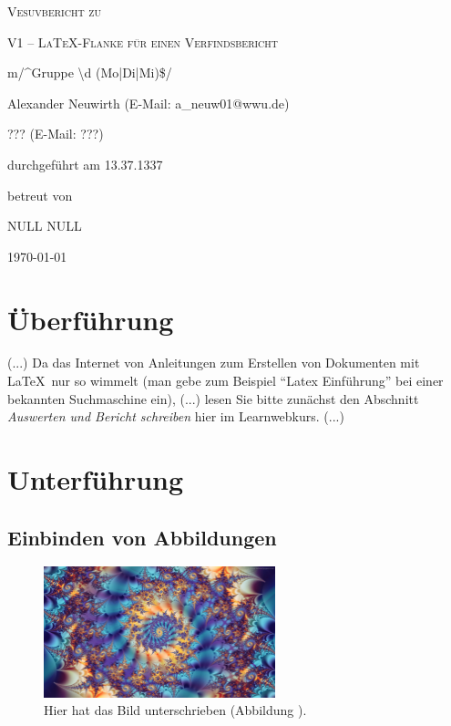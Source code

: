 \documentclass[11pt,a4paper,titlepage]{article}
\begin{document}
\begin{titlepage}
	\centering
	{\scshape\LARGE Vesuvbericht zu \par}
	\vspace{1cm}
	{\scshape\huge V1 -- \LaTeX-Flanke für einen Verfindsbericht\par}
	\vspace{2.5cm}
	{\LARGE m/\textasciicircum{}Gruppe \textbackslash{}d (Mo|Di|Mi)\$/\par}
	\vspace{0.5cm}
	{\large Alexander Neuwirth (E-Mail: a\_neuw01@wwu.de) \par}
	{\large ??? (E-Mail: ???) \par}
	\vfill
	durchgeführt am 13.37.1337\par
	betreut von\par
	{\large NULL \textsc{NULL}}

	\vfill

	{\large \today\par}
\end{titlepage}


\tableofcontents

\newpage

\section{Überführung}

(...) Da das Internet von Anleitungen zum Erstellen von Dokumenten mit \LaTeX\ nur so wimmelt (man gebe zum Beispiel ``Latex Einführung'' bei einer bekannten Suchmaschine ein), (...) lesen Sie bitte zunächst den Abschnitt \emph{Auswerten und Bericht schreiben} hier im Learnwebkurs. (...) 

\section{Unterführung}

\subsection{Einbinden von Abbildungen}

\begin{figure}[htb]
  \centering
	\includegraphics[width=0.6\textwidth]{fractal} %
  \caption{ Hier hat das Bild unterschrieben (Abbildung \cite{fractal}).}\label{Fractal}
\end{figure}
\end{document}
